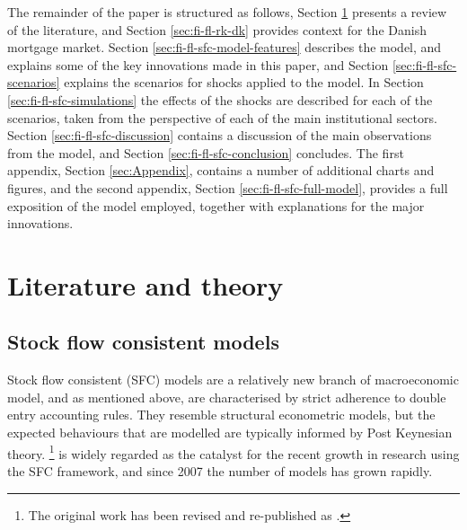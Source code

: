 \documentclass[
]{book}
\begin{document}
The remainder of the paper is structured as follows,
Section \ref{sec:fi-fl-sfc-lit} presents a review of the literature, and
Section \ref{sec:fi-fl-rk-dk} provides context for the Danish mortgage market.
Section \ref{sec:fi-fl-sfc-model-features} describes the model, and explains some of the key innovations made in this paper, and
Section \ref{sec:fi-fl-sfc-scenarios} explains the scenarios for shocks applied to the model.
In Section \ref{sec:fi-fl-sfc-simulations} the effects of the shocks are described for each of the scenarios, taken from the perspective of each of the main institutional sectors.
Section \ref{sec:fi-fl-sfc-discussion} contains a discussion of the main observations from the model, and
Section \ref{sec:fi-fl-sfc-conclusion} concludes. The first appendix,
Section \ref{sec:Appendix}, contains a number of additional charts and figures, and the second appendix,
Section \ref{sec:fi-fl-sfc-full-model}, provides a full exposition of the model employed, together with explanations for the major innovations.

\hypertarget{sec:fi-fl-sfc-lit}{%
\section{Literature and theory}\label{sec:fi-fl-sfc-lit}}

\hypertarget{stock-flow-consistent-models}{%
\subsection{Stock flow consistent models}\label{stock-flow-consistent-models}}

Stock flow consistent (SFC) models are a relatively new branch of macroeconomic model, and as mentioned above, are characterised by strict adherence to double entry accounting rules. They resemble structural econometric models, but the expected behaviours that are modelled are typically informed by Post Keynesian theory. \citet{godleylavoie2007}\footnote{The original work has been revised and re-published as \citet{godleylavoie2012}.} is widely regarded as the catalyst for the recent growth in research using the SFC framework, and since 2007 the number of models has grown rapidly.
\end{document}
